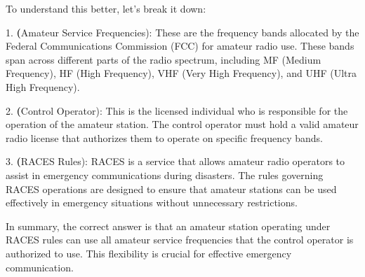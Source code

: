 To understand this better, let's break it down:

1. \textbf(Amateur Service Frequencies): These are the frequency bands allocated by the Federal Communications Commission (FCC) for amateur radio use. These bands span across different parts of the radio spectrum, including MF (Medium Frequency), HF (High Frequency), VHF (Very High Frequency), and UHF (Ultra High Frequency).

2. \textbf(Control Operator): This is the licensed individual who is responsible for the operation of the amateur station. The control operator must hold a valid amateur radio license that authorizes them to operate on specific frequency bands.

3. \textbf(RACES Rules): RACES is a service that allows amateur radio operators to assist in emergency communications during disasters. The rules governing RACES operations are designed to ensure that amateur stations can be used effectively in emergency situations without unnecessary restrictions.

In summary, the correct answer is that an amateur station operating under RACES rules can use all amateur service frequencies that the control operator is authorized to use. This flexibility is crucial for effective emergency communication.

